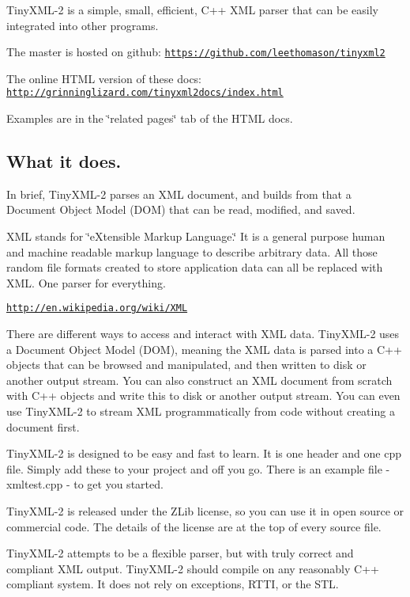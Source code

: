 

Tiny\+X\+M\+L-\/2 is a simple, small, efficient, C++ X\+ML parser that can be easily integrated into other programs.

The master is hosted on github\+: \href{https://github.com/leethomason/tinyxml2}{\tt https\+://github.\+com/leethomason/tinyxml2}

The online H\+T\+ML version of these docs\+: \href{http://grinninglizard.com/tinyxml2docs/index.html}{\tt http\+://grinninglizard.\+com/tinyxml2docs/index.\+html}

Examples are in the \char`\"{}related pages\char`\"{} tab of the H\+T\+ML docs.

\subsection*{What it does. }

In brief, Tiny\+X\+M\+L-\/2 parses an X\+ML document, and builds from that a Document Object Model (D\+OM) that can be read, modified, and saved.

X\+ML stands for \char`\"{}e\+Xtensible Markup Language.\char`\"{} It is a general purpose human and machine readable markup language to describe arbitrary data. All those random file formats created to store application data can all be replaced with X\+ML. One parser for everything.

\href{http://en.wikipedia.org/wiki/XML}{\tt http\+://en.\+wikipedia.\+org/wiki/\+X\+ML}

There are different ways to access and interact with X\+ML data. Tiny\+X\+M\+L-\/2 uses a Document Object Model (D\+OM), meaning the X\+ML data is parsed into a C++ objects that can be browsed and manipulated, and then written to disk or another output stream. You can also construct an X\+ML document from scratch with C++ objects and write this to disk or another output stream. You can even use Tiny\+X\+M\+L-\/2 to stream X\+ML programmatically from code without creating a document first.

Tiny\+X\+M\+L-\/2 is designed to be easy and fast to learn. It is one header and one cpp file. Simply add these to your project and off you go. There is an example file -\/ xmltest.\+cpp -\/ to get you started.

Tiny\+X\+M\+L-\/2 is released under the Z\+Lib license, so you can use it in open source or commercial code. The details of the license are at the top of every source file.

Tiny\+X\+M\+L-\/2 attempts to be a flexible parser, but with truly correct and compliant X\+ML output. Tiny\+X\+M\+L-\/2 should compile on any reasonably C++ compliant system. It does not rely on exceptions, R\+T\+TI, or the S\+TL.

